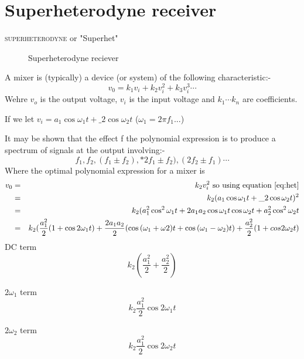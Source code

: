 \documentclass[11pt]{article} %
\begin{document}
\section{Superheterodyne receiver}
\textsc{superheterodyne} or "Superhet"

\begin{figure}[h]
	\centering
	\begin{tikzpicture}
	\end{tikzpicture}
	\label{fig:superhetrec}
	\caption{Superheterodyne reciever}
\end{figure}

A mixer is (typically) a device (or system) of the following characteristic:-
	\begin{equation}
		v_0 = k_1v_i+k_2v_i^2+k_3v_i^3 \cdots
	\end{equation}
	Wehre $v_o$ is the output voltage, $v_i$ is the input voltage and $k_1 \cdots k_n$ are coefficients.

If we let $v_i=a_1 \cos{\omega_1t} + \_2 \cos{\omega_2t} \label{eq:het}$ ($\omega_1=2\pi f_1$...)

It may be shown that the effect f the polynomial expression is to produce a spectrum of signals at the output involving:-
\begin{equation}
f_1, f_2, (f_1\pm f_2), *2f_1\pm f_2), (2f_2 \pm f_1)\cdots
\end{equation}
Where the optimal polynomial expression for a mixer is
\begin{eqnarray}
v_0 &=& k_2 v_i^2 \mbox{ so using equation \ref{eq:het}} \nonumber \\
&=& k_2(a_1 \cos{\omega_1t} + \_2 \cos{\omega_2t})^2 \nonumber \\
&=& k_2(a_1^2 \cos^2{\omega_1t} + 2a_1a_2\cos{\omega_1t}\cos{\omega_2t}+ a^2_2\cos^2{\omega_2t}\nonumber \\
&=& k_2(\frac{a_1^2}{2}(1+\cos{2\omega_1t})+
\frac{2a_1 a_2}{2}(\cos{(\omega_1+\omega2 )t}+\cos{(\omega_1-\omega_2)t})+\frac{a_2^2}{2}(1+cos{2\omega_2t}) 
\end{eqnarray}
DC term
\begin{equation}
k_2\left(\frac{a_1^2}{2} + \frac{a_2^2}{2}\right)
\end{equation}

$2\omega_1$ term
\begin{equation}
	k_2\frac{a_1^2}{2}\cos{2\omega_1t}
\end{equation}

$2\omega_2$ term
\begin{equation}
	k_2\frac{a_1^2}{2}\cos{2\omega_2t}
\end{equation}
\end{document}

